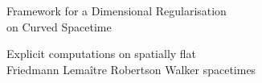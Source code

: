 \documentclass[9pt]{beamer}
\begin{document}


{%
%
%
%
\begin{frame}%
\bf
\vspace*{30pt}
%
\begin{exampleblock}{\vspace*{-3ex}}%
%
\begin{center}%
%
\Large Framework for a Dimensional Regularisation \\[10pt] on Curved Spacetime
%
\end{center}%
%
\end{exampleblock}%
%
\end{frame}
%
}%


{
\begin{frame}
\bf
\begin{exampleblock}{\vspace*{-3ex}}
\begin{center}
\Large Explicit computations on spatially flat \\[10pt] Friedmann Lemaître Robertson Walker spacetimes
\end{center}
\end{exampleblock}
\end{frame}
}

\end{document}
